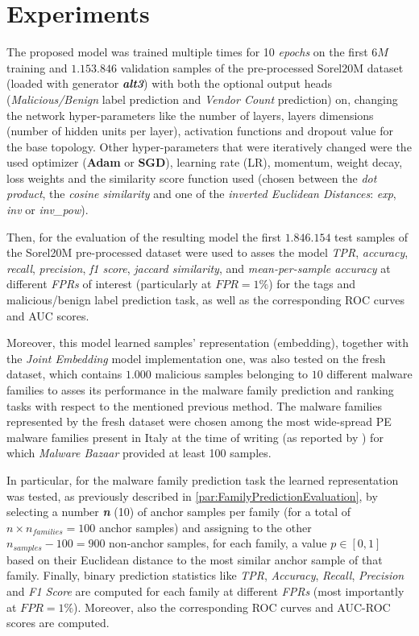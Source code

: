 \documentclass[pdfa%
,cucitura%
]{toptesi}
\begin{document}
\section{Experiments}
The proposed model was trained multiple times for 10 \textit{epochs} on the first $6M$ training and $1.153.846$ validation samples of the pre-processed Sorel20M dataset (loaded with generator \textit{\textbf{alt3}}) with both the optional output heads (\textit{Malicious/Benign} label prediction and \textit{Vendor Count} prediction) on, changing the network hyper-parameters like the number of layers, layers dimensions (number of hidden units per layer), activation functions and dropout value for the base topology. Other hyper-parameters that were iteratively changed were the used optimizer (\textbf{Adam} or \textbf{SGD}), learning rate (LR), momentum, weight decay, loss weights and the similarity score function used (chosen between the \textit{dot product}, the \textit{cosine similarity} and one of the \textit{inverted Euclidean Distances}: \textit{exp}, \textit{inv} or \textit{inv\_pow}).

Then, for the evaluation of the resulting model the first $1.846.154$ test samples of the Sorel20M pre-processed dataset were used to asses the model \textit{TPR}, \textit{accuracy}, \textit{recall}, \textit{precision}, \textit{f1 score}, \textit{jaccard similarity}, and \textit{mean-per-sample accuracy} at different \textit{FPRs} of interest (particularly at $FPR=1\%$) for the tags and malicious/benign label prediction task, as well as the corresponding ROC curves and AUC scores.

Moreover, this model learned samples' representation (embedding), together with the \textit{Joint Embedding} model implementation one, was also tested on the fresh dataset, which contains $1.000$ malicious samples belonging to $10$ different malware families to asses its performance in the malware family prediction and ranking tasks with respect to the mentioned previous method. The malware families represented by the fresh dataset were chosen among the most wide-spread PE malware families present in Italy at the time of writing (as reported by \cite{CERTAGID}) for which \textit{Malware Bazaar} \cite{MalwareBazaar} provided at least 100 samples.

In particular, for the malware family prediction task the learned representation was tested, as previously described in \ref{par:FamilyPredictionEvaluation}, by selecting a number \textit{\textbf{n}} (10) of anchor samples per family (for a total of $n \times n_{families} = 100$ anchor samples) and assigning to the other $n_{samples} - 100 = 900$ non-anchor samples, for each family, a value $p\in[0,1]$ based on their Euclidean distance to the most similar anchor sample of that family. Finally, binary prediction statistics like \textit{TPR}, \textit{Accuracy}, \textit{Recall}, \textit{Precision} and \textit{F1 Score} are computed for each family at different \textit{FPRs} (most importantly at $FPR=1\%$). Moreover, also the corresponding ROC curves and AUC-ROC scores are computed.
\end{document}
